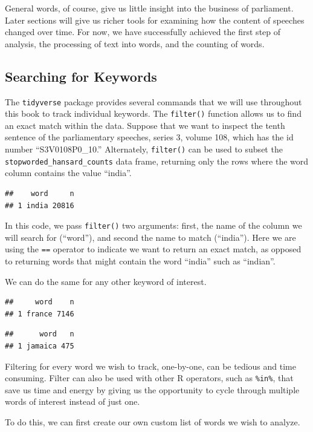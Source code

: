 \documentclass[
]{article}
\begin{document}
General words, of course, give us little insight into the business of
parliament. Later sections will give us richer tools for examining how
the content of speeches changed over time. For now, we have successfully
achieved the first step of analysis, the processing of text into words,
and the counting of words.

\subsection{Searching for Keywords}\label{searching-for-keywords}

The \texttt{tidyverse} package provides several commands that we will
use throughout this book to track individual keywords. The
\texttt{filter()} function allows us to find an exact match within the
data. Suppose that we want to inspect the tenth sentence of the
parliamentary speeches, series 3, volume 108, which has the id number
``S3V0108P0\_10.'' Alternately, \texttt{filter()} can be used to subset
the \texttt{stopworded\_hansard\_counts} data frame, returning only the
rows where the word column contains the value ``india''.

\begin{verbatim}
##    word     n
## 1 india 20816
\end{verbatim}

In this code, we pass \texttt{filter()} two arguments: first, the name
of the column we will search for (``word''), and second the name to
match (``india''). Here we are using the \texttt{==} operator to
indicate we want to return an exact match, as opposed to returning words
that might contain the word ``india'' such as ``indian''.

We can do the same for any other keyword of interest.

\begin{verbatim}
##     word    n
## 1 france 7146
\end{verbatim}

\begin{verbatim}
##      word   n
## 1 jamaica 475
\end{verbatim}

Filtering for every word we wish to track, one-by-one, can be tedious
and time consuming. Filter can also be used with other R operators, such
as \texttt{\%in\%}, that save us time and energy by giving us the
opportunity to cycle through multiple words of interest instead of just
one.

To do this, we can first create our own custom list of words we wish to
analyze.
\end{document}
